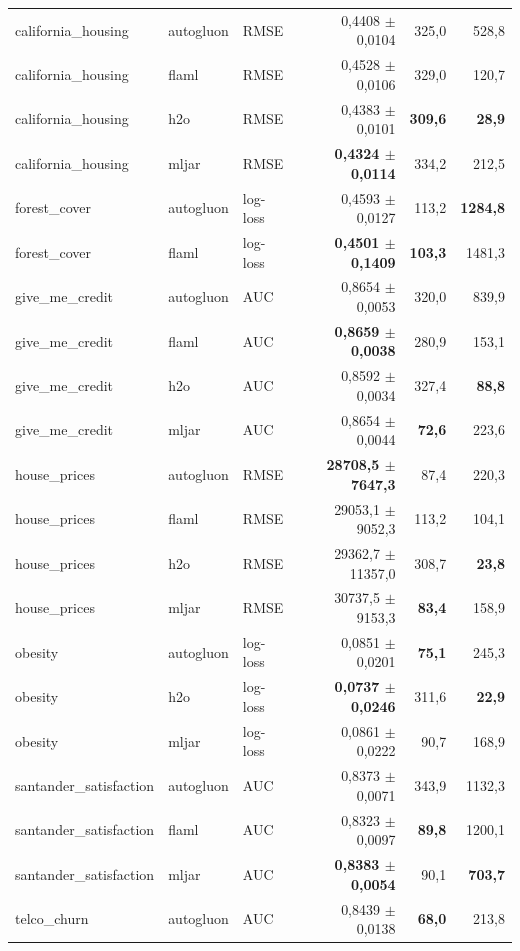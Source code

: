 \begin{longtable}{@{}l l l r r r@{}}
\midrule
california\_housing & autogluon & RMSE & 0,4408 $\pm$ 0,0104 & 325,0 & 528,8 \\
california\_housing & flaml     & RMSE & 0,4528 $\pm$ 0,0106 & 329,0 & 120,7 \\
california\_housing & h2o       & RMSE & 0,4383 $\pm$ 0,0101 & \textbf{309,6} & \textbf{28,9} \\
california\_housing & mljar     & RMSE & \textbf{0,4324 $\pm$ 0,0114} & 334,2 & 212,5 \\
\midrule
forest\_cover & autogluon & log-loss & 0,4593 $\pm$ 0,0127 & 113,2 & \textbf{1284,8} \\
forest\_cover & flaml     & log-loss & \textbf{0,4501 $\pm$ 0,1409} & \textbf{103,3} & 1481,3 \\
\midrule
give\_me\_credit & autogluon & AUC & 0,8654 $\pm$ 0,0053 & 320,0 & 839,9 \\
give\_me\_credit & flaml     & AUC & \textbf{0,8659 $\pm$ 0,0038} & 280,9 & 153,1 \\
give\_me\_credit & h2o       & AUC & 0,8592 $\pm$ 0,0034 & 327,4 & \textbf{88,8} \\
give\_me\_credit & mljar     & AUC & 0,8654 $\pm$ 0,0044 & \textbf{72,6} & 223,6 \\
\midrule
house\_prices & autogluon & RMSE & \textbf{28708,5 $\pm$ 7647,3} & 87,4 & 220,3 \\
house\_prices & flaml     & RMSE & 29053,1 $\pm$ 9052,3 & 113,2 & 104,1 \\
house\_prices & h2o       & RMSE & 29362,7 $\pm$ 11357,0 & 308,7 & \textbf{23,8} \\
house\_prices & mljar     & RMSE & 30737,5 $\pm$ 9153,3 & \textbf{83,4} & 158,9 \\
\midrule
obesity & autogluon & log-loss & 0,0851 $\pm$ 0,0201 & \textbf{75,1} & 245,3 \\
obesity & h2o       & log-loss & \textbf{0,0737 $\pm$ 0,0246} & 311,6 & \textbf{22,9} \\
obesity & mljar     & log-loss & 0,0861 $\pm$ 0,0222 & 90,7 & 168,9 \\
\midrule
santander\_satisfaction & autogluon & AUC & 0,8373 $\pm$ 0,0071 & 343,9 & 1132,3 \\
santander\_satisfaction & flaml     & AUC & 0,8323 $\pm$ 0,0097 & \textbf{89,8} & 1200,1 \\
santander\_satisfaction & mljar     & AUC & \textbf{0,8383 $\pm$ 0,0054} & 90,1 & \textbf{703,7} \\
\midrule
telco\_churn & autogluon & AUC & 0,8439 $\pm$ 0,0138 & \textbf{68,0} & 213,8 \\

\end{longtable}
